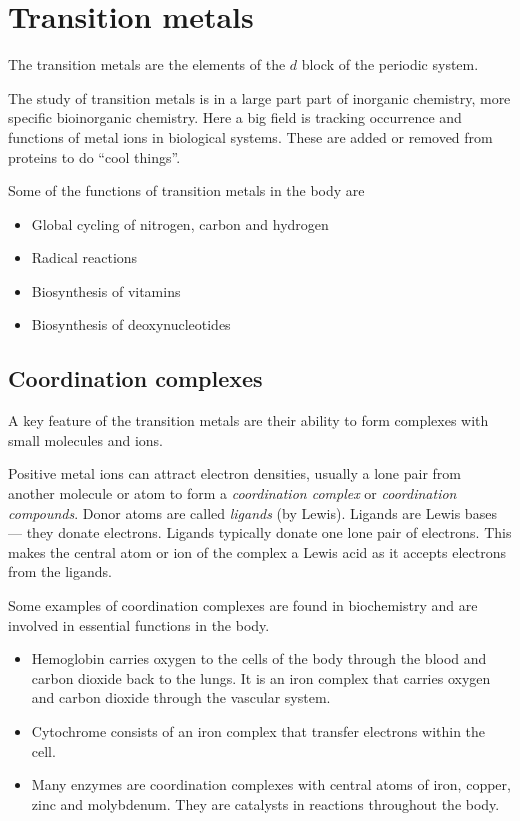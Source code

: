 \documentclass[../mit-general-chemistry.tex]{subfiles}
\begin{document}
\chapter{Transition metals}


The transition metals are the elements of the $d$ block of the
periodic system.

The study of transition metals is in a large part part of inorganic
chemistry, more specific bioinorganic chemistry. Here a big field is
tracking occurrence and functions of metal ions in biological
systems. These are added or removed from proteins to do ``cool
things''.

Some of the functions of transition metals in the body are
\begin{itemize}
\item Global cycling of nitrogen, carbon and hydrogen
\item Radical reactions
\item Biosynthesis of vitamins
\item Biosynthesis of deoxynucleotides
\end{itemize}




\section{Coordination complexes}



A key feature of the transition metals are their ability to form
complexes with small molecules and ions.

Positive metal ions can attract electron densities, usually a lone
pair from another molecule or atom to form a {\em coordination
  complex} or {\em coordination compounds}. Donor atoms are called
{\em ligands} (by Lewis). Ligands are Lewis bases --- they donate
electrons. Ligands typically donate one lone pair of electrons. This
makes the central atom or ion of the complex a Lewis acid as it
accepts electrons from the ligands.


Some examples of coordination complexes are found in biochemistry and
are involved in essential functions in the body.

\begin{itemize}
\item
  Hemoglobin carries oxygen to the cells of the body through the blood
  and carbon dioxide back to the lungs. It is an iron complex that
  carries oxygen and carbon dioxide through the vascular system.
\item
  Cytochrome consists of an iron complex that transfer electrons
  within the cell.
\item
  Many enzymes are coordination complexes with central atoms of iron,
  copper, zinc and molybdenum. They are catalysts in reactions
  throughout the body.
\end{itemize}
\end{document}
